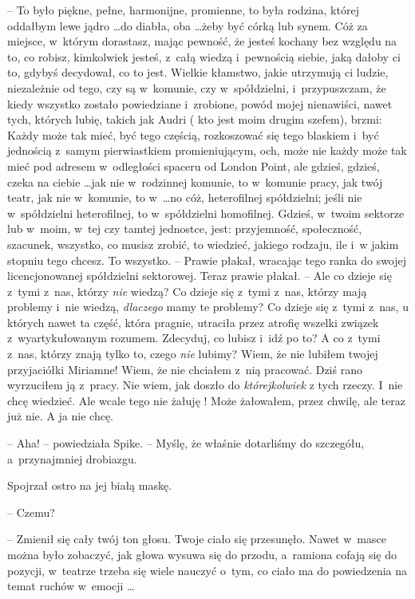 \documentclass[oneside,polish,11pt,rmheadings]{mwbk}
\begin{document}
-- To było piękne, pełne, harmonijne, promienne, to była rodzina, której oddałbym lewe jądro \ldots  do diabła, oba  \ldots  żeby być córką lub synem. Cóż za miejsce, w~którym dorastasz, mając pewność, że jesteś kochany bez względu na to, co robisz, kimkolwiek jesteś, z~całą wiedzą i~pewnością siebie, jaką dałoby ci to, gdybyś decydował, co to jest. Wielkie kłamstwo, jakie utrzymują ci ludzie, niezależnie od tego, czy są w~komunie, czy w~spółdzielni, i~przypuszczam, że kiedy wszystko zostało powiedziane i~zrobione, powód mojej nienawiści, nawet tych, których lubię, takich jak Audri ( kto jest moim drugim szefem), brzmi: Każdy może tak mieć, być tego częścią, rozkoszować się tego blaskiem i~być jednością z~samym pierwiastkiem promieniującym, och, może nie każdy może tak mieć pod adresem w~odległości spaceru od London Point, ale gdzieś, gdzieś, czeka na ciebie \ldots  jak nie w~rodzinnej komunie, to w~komunie pracy, jak twój teatr, jak nie w~komunie, to w~\ldots  no cóż, heterofilnej spółdzielni; jeśli nie w~spółdzielni heterofilnej, to w~spółdzielni homofilnej. Gdzieś, w~twoim sektorze lub w~moim, w~tej czy tamtej jednostce, jest: przyjemność, społeczność, szacunek, wszystko, co musisz zrobić, to wiedzieć, jakiego rodzaju, ile i~w jakim stopniu tego chcesz. To wszystko. -- Prawie płakał, wracając tego ranka do swojej licencjonowanej spółdzielni sektorowej. Teraz prawie płakał. -- Ale co dzieje się z~tymi z~nas, którzy \textit{nie }wiedzą? Co dzieje się z~tymi z~nas, którzy mają problemy i~nie wiedzą, \textit{dlaczego }mamy te problemy? Co dzieje się z~tymi z~nas, u których nawet ta część, która pragnie, utraciła przez atrofię wszelki związek z~wyartykułowanym rozumem. Zdecyduj, co lubisz i~idź po to? A co z~tymi z~nas, którzy znają tylko to, czego \textit{nie }lubimy? Wiem, że nie lubiłem twojej przyjaciółki Miriamne! Wiem, że nie chciałem z~nią pracować. Dziś rano wyrzuciłem ją z~pracy. Nie wiem, jak doszło do \textit{którejkolwiek }z tych rzeczy. I~nie chcę wiedzieć. Ale wcale tego nie żałuję ! Może żałowałem, przez chwilę, ale teraz już nie. A ja nie chcę. 

-- Aha! -- powiedziała Spike. -- Myślę, że właśnie dotarliśmy do szczegółu, a~przynajmniej drobiazgu. 

Spojrzał ostro na jej białą maskę. 

-- Czemu? 

-- Zmienił się cały twój ton głosu. Twoje ciało się przesunęło. Nawet w~masce można było zobaczyć, jak głowa wysuwa się do przodu, a~ramiona cofają się do pozycji, w~teatrze trzeba się wiele nauczyć o~tym, co ciało ma do powiedzenia na temat ruchów w~emocji \ldots  
\end{document}
